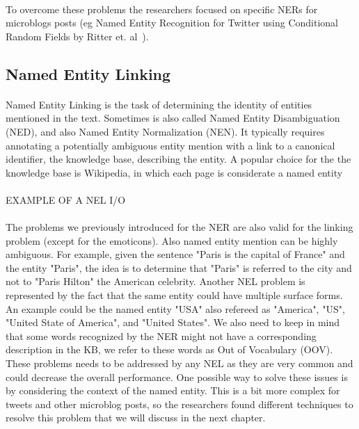 \paragraph{}
To overcome these problems the researchers focused on specific NERs for microblogs posts (eg Named Entity Recognition for Twitter using Conditional Random Fields by Ritter et. al~\cite{ritter2011named}).
\subsection{Named Entity Linking}
\paragraph{}
Named Entity Linking is the task of determining the identity of entities mentioned in the text. Sometimes is also called Named Entity Disambiguation (NED), and also Named Entity Normalization (NEN). It typically requires annotating a potentially ambiguous entity mention with a link to a canonical identifier, the knowledge base, describing the entity. A popular choice for the the knowledge base is Wikipedia, in which each page is considerate a named entity \\
\\
EXAMPLE OF A NEL I/O

\paragraph{}
The problems we previously introduced for the NER are also valid for the linking problem (except for the emoticons). Also named entity mention can be highly ambiguous. For example, given the sentence "Paris is the capital of France" and the entity "Paris", the idea is to determine that "Paris" is referred to the city and not to "Paris Hilton" the American celebrity. Another NEL problem is represented by the fact that the same entity could have multiple surface forms. An example could be the named entity "USA" also refereed as "America", "US", "United State of America", and "United States". We also need to keep in mind that some words recognized by the NER might not have a corresponding description in the KB, we refer to these words as Out of Vocabulary (OOV). These problems needs to be addressed by any NEL as they are very common and could decrease the overall performance. One possible way to solve these issues is by considering the context of the named entity. This is a bit more complex for tweets and other microblog posts, so the researchers found different techniques to resolve this problem that we will discuss in the next chapter.

